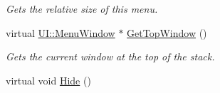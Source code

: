 \begin{DoxyCompactItemize}
\begin{DoxyCompactList}\small\item\em Gets the relative size of this menu. \item\end{DoxyCompactList}\item 
virtual \hyperlink{classphys_1_1UI_1_1MenuWindow}{UI::MenuWindow} $\ast$ \hyperlink{classphys_1_1UI_1_1Menu_acf9a3bc3dd097093cce077cc60c14a6f}{GetTopWindow} ()
\begin{DoxyCompactList}\small\item\em Gets the current window at the top of the stack. \item\end{DoxyCompactList}\item 
\hypertarget{classphys_1_1UI_1_1Menu_a23f7b18c8bae528dc15bf8f3ff40d435}{
virtual void \hyperlink{classphys_1_1UI_1_1Menu_a23f7b18c8bae528dc15bf8f3ff40d435}{Hide} ()}
\label{classphys_1_1UI_1_1Menu_a23f7b18c8bae528dc15bf8f3ff40d435}


\end{DoxyCompactItemize}
